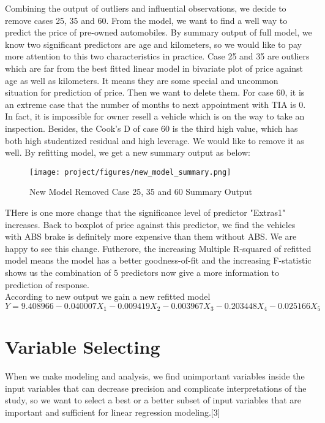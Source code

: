 \documentclass[a4paper]{article}
\begin{document}
\noindent
Combining the output of outliers and influential observations, we decide to remove cases 25, 35 and 60. From the model, we want to find a well way to predict the price of pre-owned automobiles. By summary output of full model, we know two significant predictors are age and kilometers, so we would like to pay more attention to this two characteristics in practice. Case 25 and 35 are outliers which are far from the best fitted linear model in bivariate plot of price against age as well as kilometers. It means they are some special and uncommon situation for prediction of price. Then we want to delete them. For case 60, it is an extreme case that the number of months to next appointment with TIA is 0. In fact, it is impossible for owner resell a vehicle which is on the way to take an inspection. Besides, the Cook's D of case 60 is the third high value, which has both high studentized residual and high leverage. We would like to remove it as well. By refitting model, we get a new summary output as below:\\
\begin{figure}[!htb]
    \centering
    \texttt{[image: project/figures/new\_model\_summary.png]}
    \caption{New Model Removed Case 25, 35 and 60 Summary Output}
    \label{3}
\end{figure}

\noindent
THere is one more change that the significance level of predictor "Extras1" increases. Back to boxplot of price against this predictor, we find the vehicles with ABS brake is definitely more expensive than them without ABS. We are happy to see this change. Futherore, the increasing Multiple R-squared of refitted model means the model has a better goodness-of-fit and the increasing F-statistic shows us the combination of 5 predictors now give a more information to prediction of response.\\

\noindent
According to new output we gain a new refitted model
\[Y=9.408966-0.040007X_1-0.009419X_2-0.003967X_3-0.203448X_4-0.025166X_5\]












\newpage
\section{Variable Selecting}
When we make modeling and analysis, we find unimportant variables inside the input variables that can decrease precision and complicate interpretations of the study, so we want to select a best or a better subset of input variables that are important and sufficient for linear regression modeling.[3] \\
\end{document}
